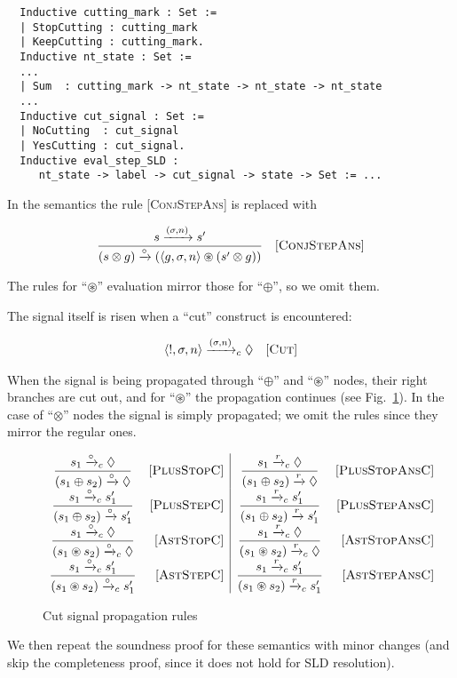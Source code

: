 \begin{lstlisting}
  Inductive cutting_mark : Set :=
  | StopCutting : cutting_mark
  | KeepCutting : cutting_mark.
  Inductive nt_state : Set :=
  ...
  | Sum  : cutting_mark -> nt_state -> nt_state -> nt_state
  ...
  Inductive cut_signal : Set :=
  | NoCutting  : cut_signal
  | YesCutting : cut_signal.
  Inductive eval_step_SLD :
     nt_state -> label -> cut_signal -> state -> Set := ...
\end{lstlisting}

In the semantics the rule \textsc{[ConjStepAns]} is replaced with

\[
\begin{array}{cr}
  \dfrac{s \xrightarrow{(\sigma, n)} s'}{(s \otimes g) \xrightarrow{\circ} (\left<{g, \sigma, n}\right> \circledast (s' \otimes g))} & \mbox{[\textsc{ConjStepAns}]} 
\end{array}
\]

The rules for ``$\circledast$'' evaluation mirror those for ``$\oplus$'', so we omit them.

The signal itself is risen when a ``cut'' construct is encountered:

\[
\begin{array}{cr}
  \left<{!, \sigma, n}\right> \xrightarrow{(\sigma, n)}_c \Diamond &\mbox{[\textsc{Cut}]} 
\end{array}
\]

When the signal is being propagated through ``$\oplus$'' and ``$\circledast$'' nodes, their right branches are cut out, and for ``$\circledast$'' the
propagation continues (see Fig.~\ref{cut-signal-propagation}). In the case of ``$\otimes$'' nodes the signal is simply propagated; we omit the rules since they mirror the regular ones.

\begin{figure*}
\[
\begin{array}{cr|cr}
  \dfrac{s_1 \xrightarrow{\circ}_c \Diamond}{(s_1 \oplus s_2) \xrightarrow{\circ} \Diamond} & \mbox{[\textsc{PlusStopC}]}&
  \dfrac{s_1 \xrightarrow{r}_c \Diamond}{(s_1 \oplus s_2) \xrightarrow{r} \Diamond} & \mbox{[\textsc{PlusStopAnsC}]}\\
  \dfrac{s_1 \xrightarrow{\circ}_c s'_1}{(s_1 \oplus s_2) \xrightarrow{\circ} s'_1} &\mbox{[\textsc{PlusStepC}]}&
  \dfrac{s_1 \xrightarrow{r}_c s'_1}{(s_1 \oplus s_2) \xrightarrow{r} s'_1} &\mbox{[\textsc{PlusStepAnsC}]}\\
  \dfrac{s_1 \xrightarrow{\circ}_c \Diamond}{(s_1 \circledast s_2) \xrightarrow{\circ}_c \Diamond} & \mbox{[\textsc{AstStopC}]}&
  \dfrac{s_1 \xrightarrow{r}_c \Diamond}{(s_1 \circledast s_2) \xrightarrow{r}_c \Diamond} & \mbox{[\textsc{AstStopAnsC}]}\\
  \dfrac{s_1 \xrightarrow{\circ}_c s'_1}{(s_1 \circledast s_2) \xrightarrow{\circ}_c s'_1} &\mbox{[\textsc{AstStepC}]}&
  \dfrac{s_1 \xrightarrow{r}_c s'_1}{(s_1 \circledast s_2) \xrightarrow{r}_c s'_1} &\mbox{[\textsc{AstStepAnsC}]}
\end{array}
\]
\caption{Cut signal propagation rules}
\label{cut-signal-propagation}
\end{figure*}

We then repeat the soundness proof for these semantics with minor changes (and skip the completeness proof, since it does not hold for SLD resolution).
